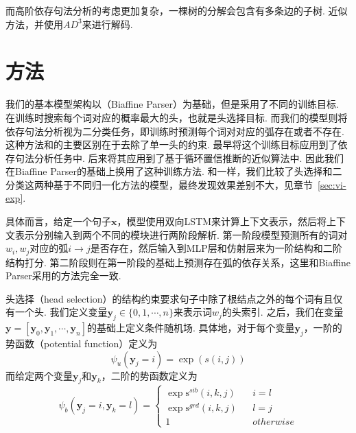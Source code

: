 而高阶依存句法分析的考虑更加复杂，一棵树的分解会包含有多条边的子树.
近似方法\cite{smith-eisner-2008-dependency,gormley-etal-2015-approximation}，并使用$AD^3$\cite{martins-etal-2011-dual,martins-etal-2013-turning}来进行解码.

\section{方法}\label{sec:vi-approach}

我们的基本模型架构以\cite{dozat-etal-2017-biaffine}（Biaffine Parser）为基础，但是采用了不同的训练目标.
\cite{dozat-etal-2017-biaffine}在训练时搜索每个词对应的概率最大的头，也就是头选择目标\cite{zhang-etal-2017-head}.
而我们的模型则将依存句法分析视为二分类任务，即训练时预测每个词对对应的弧存在或者不存在.
这种方法和\cite{dozat-etal-2017-biaffine}的主要区别在于去除了单一头的约束.
\cite{eisner-1996-three}最早将这个训练目标应用到了依存句法分析任务中.
\cite{smith-eisner-2008-dependency}后来将其应用到了基于循环置信推断的近似算法中.
因此我们在Biaffine Parser的基础上换用了这种训练方法.
和\cite{zhang-etal-2019-empirical}一样，我们比较了头选择和二分类这两种基于不同归一化方法的模型，最终发现效果差别不大，见章节~\ref{sec:vi-exp}.

具体而言，给定一个句子$\boldsymbol{x}$，模型使用双向LSTM来计算上下文表示，然后将上下文表示分别输入到两个不同的模块进行两阶段解析.
第一阶段模型预测所有的词对$w_i,w_j$对应的弧$i\rightarrow j$是否存在，然后输入到MLP层和仿射层来为一阶结构和二阶结构打分.
第二阶段则在第一阶段的基础上预测存在弧的依存关系，这里和Biaffine Parser采用的方法完全一致.

头选择（head selection）的结构约束要求句子中除了根结点之外的每个词有且仅有一个头.
我们定义变量$\boldsymbol{y}_j\in \{0,1,\cdots,n\}$来表示词$w_j$的头索引.
之后，我们在变量$\boldsymbol{y}= [\boldsymbol{y}_0,\boldsymbol{y}_1,\cdots,\boldsymbol{y}_n]$的基础上定义条件随机场.
具体地，对于每个变量$\boldsymbol{y}_j$，一阶的势函数（potential function）定义为
\begin{equation}
    \label{eq:1o-potential}
    \psi_u(\boldsymbol{y}_j=i)=\exp(s(i, j))
\end{equation}
而给定两个变量$\boldsymbol{y}_j$和$\boldsymbol{y}_k$，二阶的势函数定义为
\begin{equation}
    \label{eq:2o-potential}
    \psi_b(\boldsymbol{y}_j=i,\boldsymbol{y}_k=l)=\left\{
    \begin{array}{rcl}
        \exp \mathrm{s}^{sib}(i,k,j) &  & {i=l}       \\
        \exp \mathrm{s}^{grd}(i,k,j) &  & {l=j}       \\
        1                            &  & {otherwise}
    \end{array}
    \right.
\end{equation}

